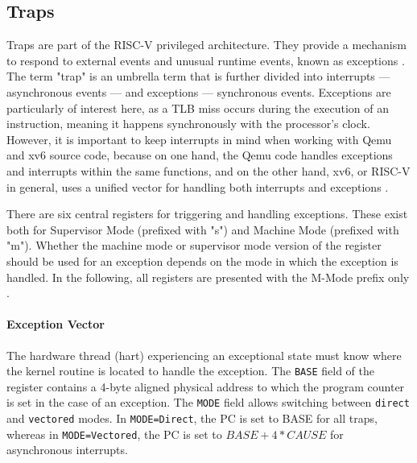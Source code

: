 
\subsection{Traps}
Traps are part of the RISC-V privileged architecture. They provide a mechanism to respond to
external events and unusual runtime events, known as exceptions \cite{riscvreader}.
The term "trap" is an umbrella term that is further divided into interrupts — asynchronous events —
and exceptions — synchronous events.
Exceptions are particularly of interest here, as a TLB miss occurs during the execution of an instruction,
meaning it happens synchronously with the processor's clock. However, it is important to keep interrupts
in mind when working with Qemu and xv6 source code, because on one hand, the Qemu code handles exceptions
and interrupts within the same functions, and on the other hand, xv6, or RISC-V in general, uses a unified
vector for handling both interrupts and exceptions \cite{RISCVInstructionSet}.

There are six central registers for triggering and handling exceptions. These exist both for
Supervisor Mode (prefixed with "s") and Machine Mode (prefixed with "m").
Whether the machine mode or supervisor mode version of the register should be used for an exception depends
on the mode in which the exception is handled. In the following, all registers are presented with the
M-Mode prefix only .


\paragraph{Exception Vector} The hardware thread (hart)  experiencing
an exceptional state must know where the kernel routine is located to handle the exception.
The \texttt{BASE} field of the register contains a 4-byte aligned physical address to which
the program counter is set in the case of an exception.
The \texttt{MODE} field allows switching between \texttt{direct} and \texttt{vectored} modes.
In \texttt{MODE=Direct}, the PC is set to BASE for all traps, whereas in \texttt{MODE=Vectored},
the PC is set to $BASE+4*CAUSE$ for asynchronous interrupts.

